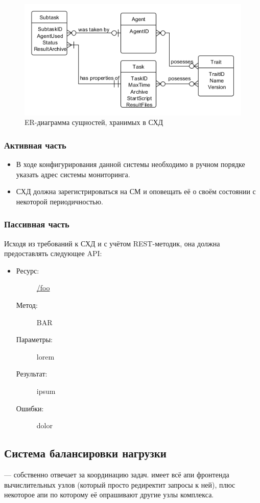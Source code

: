 \documentclass[a4paper,12pt]{report}
\numberwithin{equation}{section}
\begin{document}
\begin{figure}
  \centering
  \includegraphics[width=.9\linewidth]{diagrams/db/er}
  \caption{ER-диаграмма сущностей, хранимых в СХД}
  \label{fig:db-er}
\end{figure}

\subsubsection{Активная часть}
\begin{itemize}
  \item В ходе конфигурирования данной системы необходимо в ручном порядке указать адрес системы мониторинга.
  \item СХД должна зарегистрироваться на СМ и оповещать её о своём состоянии с некоторой периодичностью.
\end{itemize}

\subsubsection{Пассивная часть}
Исходя из требований к СХД и с учётом REST-методик, она должна предоставлять следующее API:

\begin{itemize}
  \item
  \begin{description}
    \item[Ресурс:] \url{/foo}
    \item[Метод:] BAR
    \item[Параметры:] lorem
    \item[Результат:] ipsum
    \item[Ошибки:] dolor
  \end{description}
\end{itemize}

\subsection{Система балансировки нагрузки}
--- собственно отвечает за координацию задач. имеет всё апи фронтенда вычислительных узлов (который просто редиректит запросы к ней), плюс некоторое апи по которому её опрашивают другие узлы комплекса.
\end{document}
